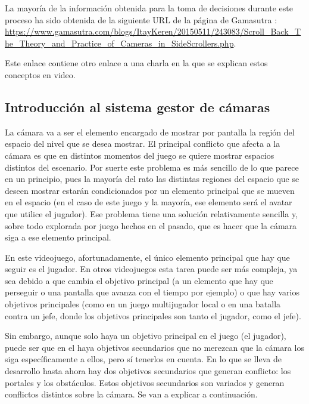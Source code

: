 La mayoría de la información obtenida para la toma de decisiones durante este proceso ha sido obtenida de la siguiente URL de la página de Gamasutra \cite{Gamasutra}:\\
 \url{https://www.gamasutra.com/blogs/ItayKeren/20150511/243083/Scroll_Back_The_Theory_and_Practice_of_Cameras_in_SideScrollers.php}.
 
Este enlace contiene otro enlace a una charla en la que se explican estos conceptos en video.

\subsection{Introducción al sistema gestor de cámaras}
La cámara va a ser el elemento encargado de mostrar por pantalla la región del espacio del nivel que se desea mostrar. El principal conflicto que afecta a la cámara es que en distintos momentos del juego se quiere mostrar espacios distintos del escenario. Por suerte este problema es más sencillo de lo que parece en un principio, pues la mayoría del rato las distintas regiones del espacio que se deseen mostrar estarán condicionados por un elemento principal que se mueven en el espacio (en el caso de este juego y la mayoría, ese elemento será el avatar que utilice el jugador). Ese problema tiene una solución relativamente sencilla y, sobre todo explorada por juego hechos en el pasado, que es hacer que la cámara siga a ese elemento principal.

En este videojuego, afortunadamente, el único elemento principal que hay que seguir es el jugador. En otros videojuegos esta tarea puede ser más compleja, ya sea debido a que cambia el objetivo principal (a un elemento que hay que perseguir o una pantalla que avanza con el tiempo por ejemplo) o que hay varios objetivos principales (como en un juego multijugador local o en una batalla contra un jefe, donde los objetivos principales son tanto el jugador, como el jefe).

Sin embargo, aunque solo haya un objetivo principal en el juego (el jugador), puede ser que en el haya objetivos secundarios que no merezcan que la cámara los siga específicamente a ellos, pero sí tenerlos en cuenta. En lo que se lleva de desarrollo hasta ahora hay dos objetivos secundarios que generan conflicto: los portales y los obstáculos. Estos objetivos secundarios son variados y generan conflictos distintos sobre la cámara. Se van a explicar a continuación.

